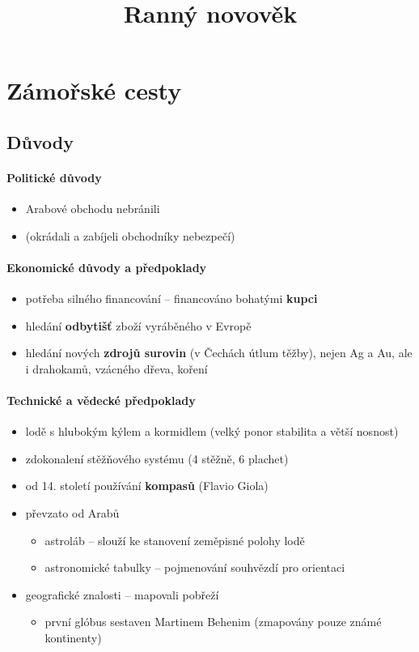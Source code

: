 \title{Ranný novověk}


\paragraph{}
\newpage
\section{Zámořské cesty}
\subsection{Důvody}
\paragraph{Politické důvody}
\begin{itemize}
\item Arabové obchodu nebránili
\item {} (okrádali a zabíjeli obchodníky \ra nebezpečí)
\end{itemize}

\paragraph{Ekonomické důvody a předpoklady}
\begin{itemize}
\item potřeba silného financování -- financováno bohatými \textbf{kupci}
\item hledání \textbf{odbytišť} zboží vyráběného v Evropě
\item hledání nových \textbf{zdrojů surovin} (v Čechách útlum těžby), nejen Ag a Au, ale i drahokamů, vzácného dřeva, koření
\end{itemize}

\paragraph{Technické a vědecké předpoklady}
\begin{itemize}
\item lodě s hlubokým kýlem a kormidlem (velký ponor \ra stabilita a větší nosnost)
\item zdokonalení stěžňového systému (4 stěžně, 6 plachet)
\item od 14. století používání \textbf{kompasů} (Flavio Giola)
\item převzato od Arabů
	\begin{itemize}
	\item astroláb -- slouží ke stanovení zeměpisné polohy lodě 
	\item astronomické tabulky -- pojmenování souhvězdí pro orientaci 
	\end{itemize}
\item geografické znalosti -- mapovali pobřeží
	\begin{itemize}
	\item první glóbus sestaven Martinem Behenim (zmapovány pouze známé kontinenty)
	\end{itemize}
\end{itemize}

